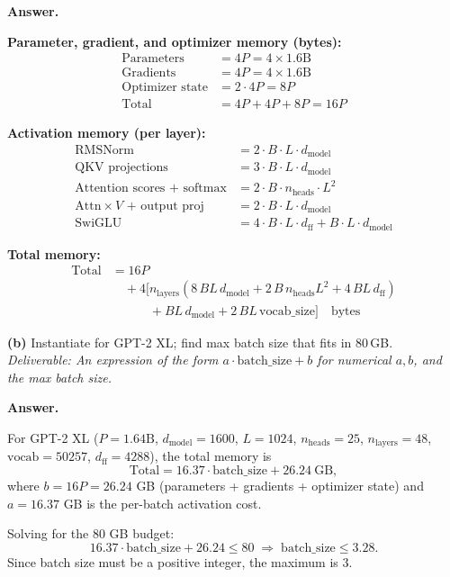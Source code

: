 \documentclass[11pt]{article}
\newenvironment{answer}%
  {\par\noindent\textbf{Answer.}\par\vspace{0.25em}\begingroup\color{black!85}}%
  {\endgroup\par\vspace{1em}}
\begin{document}
\begin{answer}

\textbf{Parameter, gradient, and optimizer memory (bytes):}
\begin{align*}
\text{Parameters} &= 4P = 4 \times 1.6\text{B} \\
\text{Gradients} &= 4P = 4 \times 1.6\text{B} \\
\text{Optimizer state} &= 2 \cdot 4P = 8P \\
\text{Total} &= 4P + 4P + 8P = 16P
\end{align*}

\textbf{Activation memory (per layer):}
\begin{align*}
\text{RMSNorm} &= 2 \cdot B \cdot L \cdot d_{\text{model}} \\
\text{QKV projections} &= 3 \cdot B \cdot L \cdot d_{\text{model}} \\
\text{Attention scores + softmax} &= 2 \cdot B \cdot n_{\text{heads}} \cdot L^2 \\
\text{Attn} \times V \text{ + output proj} &= 2 \cdot B \cdot L \cdot d_{\text{model}} \\
\text{SwiGLU} &= 4 \cdot B \cdot L \cdot d_{\text{ff}} + B \cdot L \cdot d_{\text{model}}
\end{align*}

\textbf{Total memory:}
\begin{align*}
\text{Total} &= 16P \\
&\quad + 4 \Big[ n_{\text{layers}} \left( 8\, B L\, d_{\text{model}} + 2\, B\, n_{\text{heads}} L^2 + 4\, B L\, d_{\text{ff}} \right) \\
&\qquad\quad + B L\, d_{\text{model}} + 2\, B L\, \text{vocab\_size} \Big] \quad \text{bytes}
\end{align*}

\end{answer}

\textbf{(b)} Instantiate for GPT-2 XL; find max batch size that fits in 80\,GB. \\
\emph{Deliverable: An expression of the form $a \cdot \text{batch\_size} + b$ for numerical $a, b$, and the max batch size.}
\begin{answer}
For GPT-2 XL ($P=1.64\text{B}$, $d_{\text{model}}=1600$, $L=1024$, $n_{\text{heads}}=25$, $n_{\text{layers}}=48$, $\text{vocab}=50257$, $d_{\text{ff}}=4288$), the total memory is
\[
\text{Total} = 16.37 \cdot \text{batch\_size} + 26.24 \ \text{GB},
\]
where $b = 16P = 26.24$ GB (parameters + gradients + optimizer state) and $a = 16.37$ GB is the per-batch activation cost.

Solving for the 80 GB budget:
\[
16.37 \cdot \text{batch\_size} + 26.24 \le 80 \;\Longrightarrow\; \text{batch\_size} \le 3.28.
\]
Since batch size must be a positive integer, the maximum is $\boxed{3}$.
\end{answer}
\end{document}
